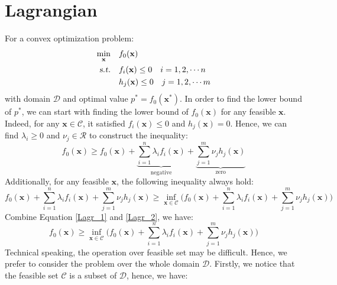 \documentclass[10pt,a4paper]{article}
\begin{document}
\section{Lagrangian}
For a convex optimization problem:
\begin{equation*}
	\begin{aligned}
		\displaystyle\min_{\mathbf{x}} \quad & f_{0}(\mathbf{x}) \\
		\textsl{s.t.} \quad & f_{i}(\mathbf{x}) \leq 0 \quad i = 1, 2, \cdots n \\
		& h_{j}(\mathbf{x}) \leq 0 \quad j = 1, 2, \cdots m
	\end{aligned}
\end{equation*}
with domain $\mathcal{D}$ and optimal value $p^{*} = f_{0}(\mathbf{x}^{*})$. In order to find the lower bound of $p^{*}$, we can start with finding the lower bound of $f_{0}(\mathbf{x})$ for any feasible $\mathbf{x}$. Indeed, for any $\mathbf{x} \in \mathcal{C}$, it satisfied $f_{i}(\mathbf{x}) \leq 0$ and $h_{j}(\mathbf{x}) = 0$. Hence, we can find $\lambda_{i} \geq 0$ and $\nu_{j} \in \mathcal{R}$ to construct the inequality:
\begin{equation}
	f_{0}(\mathbf{x}) \geq f_{0}(\mathbf{x}) + \underbrace{\displaystyle\sum_{i = 1}^{n} \lambda_{i} f_{i}(\mathbf{x})}_\text{negative} + \underbrace{\displaystyle\sum_{j  = 1}^{m} \nu_{j} h_{j}(\mathbf{x})}_\text{zero}
	\label{Lagr_1}
\end{equation}
Additionally, for any feasible $\mathbf{x}$, the following inequality always hold:
\begin{equation}
	f_{0}(\mathbf{x}) + \displaystyle\sum_{i = 1}^{n}\lambda_{i} f_{i}(\mathbf{x}) + \displaystyle\sum_{j  = 1}^{m} \nu_{j} h_{j}(\mathbf{x}) \geq \displaystyle\inf_{\mathbf{x} \in \mathcal{C}} \Big( f_{0}(\mathbf{x}) + \displaystyle\sum_{i = 1}^{n}\lambda_{i} f_{i}(\mathbf{x}) + \displaystyle\sum_{j  = 1}^{m} \nu_{j} h_{j}(\mathbf{x}) \Big)
	\label{Lagr_2}
\end{equation}
Combine Equation \ref{Lagr_1} and \ref{Lagr_2}, we have:
\begin{equation}
	f_{0}(\mathbf{x}) \geq \displaystyle\inf_{\mathbf{x} \in \mathcal{C}} \Big( f_{0}(\mathbf{x}) + \displaystyle\sum_{i = 1}^{n}\lambda_{i} f_{i}(\mathbf{x}) + \displaystyle\sum_{j  = 1}^{m} \nu_{j} h_{j}(\mathbf{x}) \Big)
	\label{Lagr_3}
\end{equation}
Technical speaking, the operation over feasible set may be difficult. Hence, we prefer to consider the problem over the whole domain $\mathcal{D}$. Firstly, we notice that the feasible set $\mathcal{C}$ is a subset of $\mathcal{D}$, hence, we have:
\end{document}
